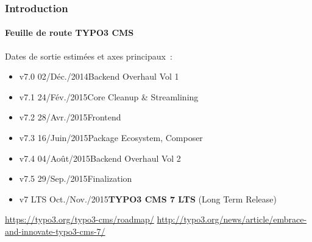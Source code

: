 \begin{frame}[fragile]
	\frametitle{Introduction}
	\framesubtitle{Feuille de route TYPO3 CMS}

	Dates de sortie estimées et axes principaux~:

	\begin{itemize}
		\item v7.0 \tabto{1.1cm}02/Déc./2014\tabto{3.4cm}Backend Overhaul Vol 1
		\item v7.1 \tabto{1.1cm}24/Fév./2015\tabto{3.4cm}Core Cleanup \& Streamlining
		\item v7.2 \tabto{1.1cm}28/Avr./2015\tabto{3.4cm}Frontend
		\item v7.3 \tabto{1.1cm}16/Juin/2015\tabto{3.4cm}Package Ecosystem, Composer
		\item v7.4 \tabto{1.1cm}04/Août/2015\tabto{3.4cm}Backend Overhaul Vol 2

		\item
			\begingroup
				\color{typo3orange}
					v7.5 \tabto{1.1cm}29/Sep./2015\tabto{3.4cm}Finalization
			\endgroup

		\item v7 LTS \tabto{1.1cm}Oct./Nov./2015\tabto{3.4cm}\textbf{TYPO3 CMS 7 LTS} (Long Term Release)
	\end{itemize}

	\smaller
		\url{https://typo3.org/typo3-cms/roadmap/}\newline
		\url{http://typo3.org/news/article/embrace-and-innovate-typo3-cms-7/}
	\normalsize

\end{frame}

